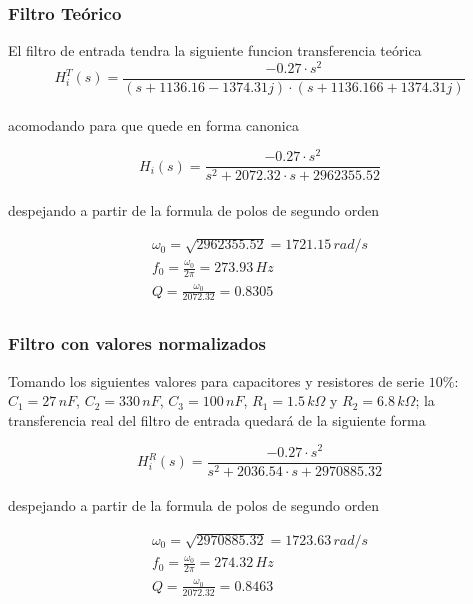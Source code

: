 \documentclass[10pt,a4paper]{article}
\begin{document}
    \subsubsection{Filtro Teórico}

    El filtro de entrada tendra la siguiente funcion transferencia teórica \\

    \[H_{i}^{T}(s)=\frac{-0.27 \cdot s^{2}}{(s + 1136.16 - 1374.31j) \cdot (s + 1136.166 + 1374.31j)}\] \\

    acomodando para que quede en forma canonica

    \[H_i(s)=\frac{-0.27 \cdot s^{2}}{s^{2}+2072.32 \cdot s + 2962355.52}\] \\

    despejando a partir de la formula de polos de segundo orden

    \begin{gather*}
        \omega_{0}= \sqrt{2962355.52} = 1721.15 \, rad/s\\
        f_{0}= \frac{\omega_{0}}{2\pi} = 273.93 \, Hz\\
        Q= \frac{\omega_0}{2072.32} = 0.8305\\
    \end{gather*}

    \subsubsection{Filtro con valores normalizados}

    Tomando los siguientes valores para capacitores y resistores de serie $10\%$:
    $C_{1} = 27 \, nF$, $C_{2} = 330 \, nF$, $C_{3} = 100 \, nF$, $R_{1} = 1.5 \, k\Omega$ y $R_{2} = 6.8 \, k\Omega$; la transferencia real del filtro de entrada quedará de la siguiente forma

    \[H_{i}^{R}(s)=\frac{-0.27 \cdot s^{2}}{s^{2}+2036.54 \cdot s + 2970885.32}\] \\

    despejando a partir de la formula de polos de segundo orden

    \begin{gather*}
        \omega_{0}= \sqrt{2970885.32} = 1723.63 \, rad/s\\
        f_{0}= \frac{\omega_{0}}{2\pi} = 274.32 \, Hz\\
        Q= \frac{\omega_0}{2072.32} = 0.8463\\
    \end{gather*}
\end{document}
